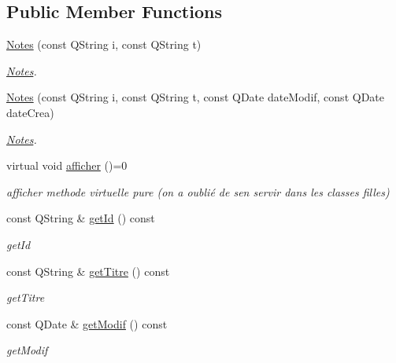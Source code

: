 \subsection*{Public Member Functions}
\begin{DoxyCompactItemize}
\item 
\hyperlink{class_notes_aff3e54629e3e1005aafc512f87c8aa8f}{Notes} (const Q\+String i, const Q\+String t)
\begin{DoxyCompactList}\small\item\em \hyperlink{class_notes}{Notes}. \end{DoxyCompactList}\item 
\hyperlink{class_notes_ab19ca69e24270ac6fd5b92c304a1bf1b}{Notes} (const Q\+String i, const Q\+String t, const Q\+Date date\+Modif, const Q\+Date date\+Crea)
\begin{DoxyCompactList}\small\item\em \hyperlink{class_notes}{Notes}. \end{DoxyCompactList}\item 
\mbox{\label{class_notes_ac5829fca5044dea12bb3290fd1c6d86d}} 
virtual void \hyperlink{class_notes_ac5829fca5044dea12bb3290fd1c6d86d}{afficher} ()=0
\begin{DoxyCompactList}\small\item\em afficher methode virtuelle pure (on a oublié de s\textquotesingle{}en servir dans les classes filles) \end{DoxyCompactList}\item 
const Q\+String \& \hyperlink{class_notes_a034e1fb763f1535b245fed61f2c07eaa}{get\+Id} () const
\begin{DoxyCompactList}\small\item\em get\+Id \end{DoxyCompactList}\item 
const Q\+String \& \hyperlink{class_notes_ad62548dca78862addfbe7c8a0b797c82}{get\+Titre} () const
\begin{DoxyCompactList}\small\item\em get\+Titre \end{DoxyCompactList}\item 
const Q\+Date \& \hyperlink{class_notes_ae375538696f0a9c0cbe446900d3eaf6e}{get\+Modif} () const
\begin{DoxyCompactList}\small\item\em get\+Modif \end{DoxyCompactList}\item 

\end{DoxyCompactItemize}
